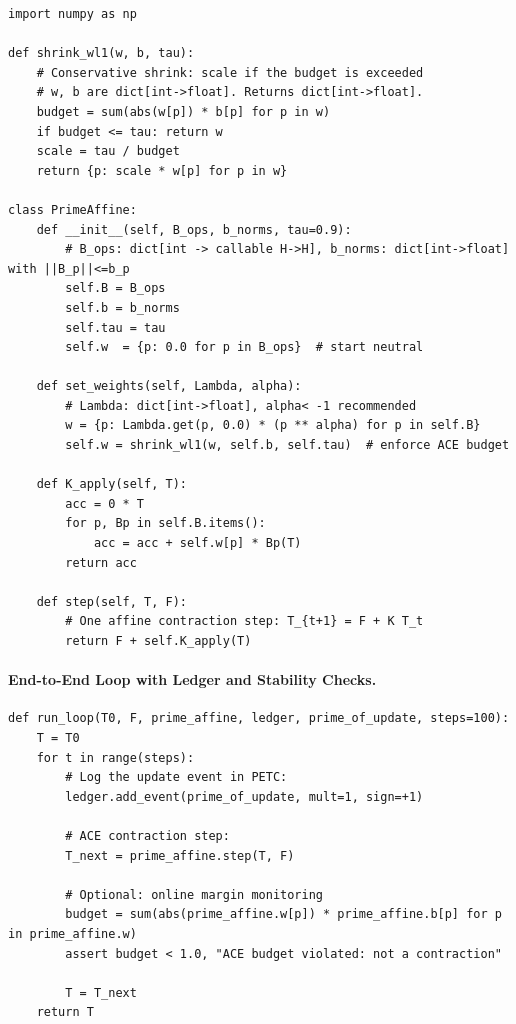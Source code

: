 \documentclass[11pt]{article}
\theoremstyle{plain}
\theoremstyle{definition}
\theoremstyle{remark}
\begin{document}
\begin{verbatim}
import numpy as np

def shrink_wl1(w, b, tau):
    # Conservative shrink: scale if the budget is exceeded
    # w, b are dict[int->float]. Returns dict[int->float].
    budget = sum(abs(w[p]) * b[p] for p in w)
    if budget <= tau: return w
    scale = tau / budget
    return {p: scale * w[p] for p in w}

class PrimeAffine:
    def __init__(self, B_ops, b_norms, tau=0.9):
        # B_ops: dict[int -> callable H->H], b_norms: dict[int->float] with ||B_p||<=b_p
        self.B = B_ops
        self.b = b_norms
        self.tau = tau
        self.w  = {p: 0.0 for p in B_ops}  # start neutral

    def set_weights(self, Lambda, alpha):
        # Lambda: dict[int->float], alpha< -1 recommended
        w = {p: Lambda.get(p, 0.0) * (p ** alpha) for p in self.B}
        self.w = shrink_wl1(w, self.b, self.tau)  # enforce ACE budget

    def K_apply(self, T):
        acc = 0 * T
        for p, Bp in self.B.items():
            acc = acc + self.w[p] * Bp(T)
        return acc

    def step(self, T, F):
        # One affine contraction step: T_{t+1} = F + K T_t
        return F + self.K_apply(T)
\end{verbatim}

\paragraph{End-to-End Loop with Ledger and Stability Checks.}
\begin{verbatim}
def run_loop(T0, F, prime_affine, ledger, prime_of_update, steps=100):
    T = T0
    for t in range(steps):
        # Log the update event in PETC:
        ledger.add_event(prime_of_update, mult=1, sign=+1)

        # ACE contraction step:
        T_next = prime_affine.step(T, F)

        # Optional: online margin monitoring
        budget = sum(abs(prime_affine.w[p]) * prime_affine.b[p] for p in prime_affine.w)
        assert budget < 1.0, "ACE budget violated: not a contraction"

        T = T_next
    return T
\end{verbatim}
\end{document}
